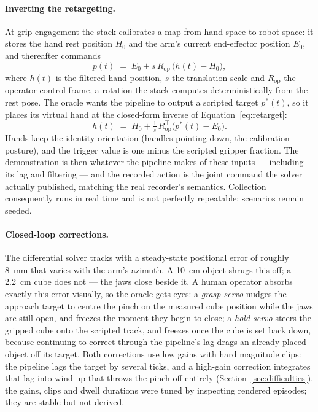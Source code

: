 \paragraph{Inverting the retargeting.}
At grip engagement the stack calibrates a map from hand space to robot
space: it stores the hand rest position $H_0$ and the arm's current
end-effector position $E_0$, and thereafter commands
\begin{equation}
  p(t) \;=\; E_0 + s\, R_{\mathrm{op}}\,\bigl(h(t) - H_0\bigr),
  \label{eq:retarget}
\end{equation}
where $h(t)$ is the filtered hand position, $s$ the translation scale
and $R_{\mathrm{op}}$ the operator control frame, a rotation the stack
computes deterministically from the rest pose. The oracle wants the
pipeline to output a scripted target $p^\ast(t)$, so it places its
virtual hand at the closed-form inverse of Equation~\ref{eq:retarget}:
\begin{equation}
  h(t) \;=\; H_0 + \tfrac{1}{s}\, R_{\mathrm{op}}^{\!\top}
  \bigl(p^\ast(t) - E_0\bigr).
\end{equation}
Hands keep the identity orientation (handles pointing down, the
calibration posture), and the trigger value is one minus the scripted
gripper fraction. The demonstration is then whatever the pipeline makes
of these inputs --- including its lag and filtering --- and the recorded
action is the joint command the solver actually published, matching the
real recorder's semantics. Collection consequently runs in real time and
is not perfectly repeatable; scenarios remain seeded.

\paragraph{Closed-loop corrections.}
The differential solver tracks with a steady-state positional error of
roughly \SI{8}{\milli\metre} that varies with the arm's azimuth. A
\SI{10}{\centi\metre} object shrugs this off; a
\SI{2.2}{\centi\metre} cube does not --- the jaws close beside it. A
human operator absorbs exactly this error visually, so the oracle gets
eyes: a \emph{grasp servo} nudges the approach target to centre the
pinch on the measured cube position while the jaws are still open, and
freezes the moment they begin to close; a \emph{hold servo} steers the
gripped cube onto the scripted track, and freezes once the cube is set
back down, because continuing to correct through the pipeline's lag
drags an already-placed object off its target. Both corrections use low
gains with hard magnitude clips: the pipeline lags the target by several
ticks, and a high-gain correction integrates that lag into wind-up that
throws the pinch off entirely (Section~\ref{sec:difficulties}).
\unjustified{} the gains, clips and dwell durations were tuned by
inspecting rendered episodes; they are stable but not derived.

